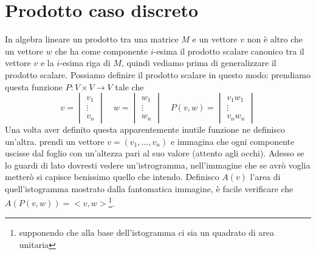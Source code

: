 \documentclass[11pt,a4paper]{article}
\theoremstyle{definition}
\theoremstyle{plain}
\theoremstyle{plain}
\begin{document}
		\section{Prodotto caso discreto}
			In algebra lineare un prodotto tra una matrice $M$ e un vettore $v$ non è altro che un vettore $w$ che ha come componente $i$-esima il prodotto scalare canonico tra il vettore $v$ e la $i$-esima riga di $M$, quindi vediamo prima di generalizzare il prodotto scalare.\newline
			Possiamo definire il prodotto scalare in questo modo: prendiamo questa funzione $P:V\times V\rightarrow V$ tale che 
			\begin{equation}
				v=
				\begin{vmatrix}
					v_1\\
					\vdots \\
					v_n
				\end{vmatrix}
				\quad w=
				\begin{vmatrix}
					w_1\\
					\vdots \\
					w_n
				\end{vmatrix}
				\quad P(v,w)=
				\begin{vmatrix}
					v_1 w_1\\
					\vdots \\
					v_n w_n
				\end{vmatrix}
			\end{equation}
			Una volta aver definito questa apparentemente inutile funzione ne definisco un'altra.
			prendi un vettore $v=(v_1,\dots,v_n)$ e immagina che ogni componente uscisse dal foglio con un'altezza pari al suo valore (attento agli occhi).\newline
			Adesso se lo guardi di lato dovresti vedere un'istrogramma, nell'immagine che se avrò voglia metterò si capisce benissimo quello che intendo.\newline
			Definisco $A(v)$ l'area di quell'istogramma mostrato dalla fantomatica immagine, è facile verificare che $A(P(v,w))=<v,w>$\footnote{supponendo che alla base dell'istogramma ci sia un quadrato di area unitaria}.
\end{document}
